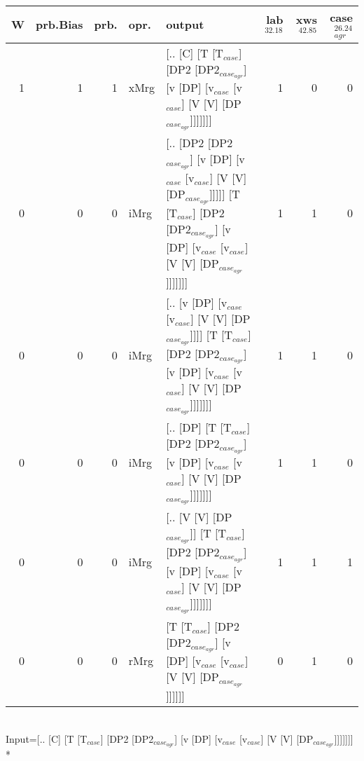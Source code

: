 \begin{tabularx}{\linewidth}{rrrlXrrr}
\hline
   W &   prb.Bias &   prb. & opr.   & output                                                                                                                                                        &   lab$^{32.18}$ &   xws$^{42.85}$ &   case$_{agr}^{26.24}$ \\
\hline
   1 &       1 &   1 & xMrg & [.. [C] [T [T$_{case}$] [DP2 [DP2$_{case_{agr}}$] [v [DP] [v$_{case}$ [v$_{case}$] [V [V] [DP$_{case_{agr}}$]]]]]]]                                                                   &             1 &             0 &                  0 \\
   0 &       0 &   0 & iMrg & [.. [DP2 [DP2$_{case_{agr}}$] [v [DP] [v$_{case}$ [v$_{case}$] [V [V] [DP$_{case_{agr}}$]]]]] [T [T$_{case}$] [DP2 [DP2$_{case_{agr}}$] [v [DP] [v$_{case}$ [v$_{case}$] [V [V] [DP$_{case_{agr}}$]]]]]]] &             1 &             1 &                  0 \\
   0 &       0 &   0 & iMrg & [.. [v [DP] [v$_{case}$ [v$_{case}$] [V [V] [DP$_{case_{agr}}$]]]] [T [T$_{case}$] [DP2 [DP2$_{case_{agr}}$] [v [DP] [v$_{case}$ [v$_{case}$] [V [V] [DP$_{case_{agr}}$]]]]]]]                      &             1 &             1 &                  0 \\
   0 &       0 &   0 & iMrg & [.. [DP] [T [T$_{case}$] [DP2 [DP2$_{case_{agr}}$] [v [DP] [v$_{case}$ [v$_{case}$] [V [V] [DP$_{case_{agr}}$]]]]]]]                                                                  &             1 &             1 &                  0 \\
   0 &       0 &   0 & iMrg & [.. [V [V] [DP$_{case_{agr}}$]] [T [T$_{case}$] [DP2 [DP2$_{case_{agr}}$] [v [DP] [v$_{case}$ [v$_{case}$] [V [V] [DP$_{case_{agr}}$]]]]]]]                                                 &             1 &             1 &                  1 \\
   0 &       0 &   0 & rMrg & [T [T$_{case}$] [DP2 [DP2$_{case_{agr}}$] [v [DP] [v$_{case}$ [v$_{case}$] [V [V] [DP$_{case_{agr}}$]]]]]]                                                                            &             0 &             1 &                  0 \\
\hline
\end{tabularx}\endgroup\\
\begingroup\scriptsize Input=[.. [C] [T [T$_{case}$] [DP2 [DP2$_{case_{agr}}$] [v [DP] [v$_{case}$ [v$_{case}$] [V [V] [DP$_{case_{agr}}$]]]]]]]\\*
